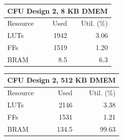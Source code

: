 \begin{table}[H]
\begin{minipage}{0.48\textwidth}
\begin{tabular}{|l|r|r|}
\end{tabular}
\end{minipage}

\vspace{15pt}

\begin{minipage}{0.48\textwidth}\centering
\begin{tabular}{|l|r|r|}
\hline
\multicolumn{3}{|c|}{\textbf{CFU Design 2, 8 KB DMEM}} \\ \hline
Resource & Used & Util. (\%) \\ \hline
LUTs & 1942 & 3.06 \\ \hline
FFs  & 1519 & 1.20 \\ \hline
BRAM & 8.5  & 6.3 \\ \hline

\end{tabular}
\end{minipage}\hfill
\begin{minipage}{0.48\textwidth}\centering
\begin{tabular}{|l|r|r|}
\hline
\multicolumn{3}{|c|}{\textbf{CFU Design 2, 512 KB DMEM}} \\ \hline
Resource & Used & Util. (\%) \\ \hline
LUTs & 2146  & 3.38 \\ \hline
FFs  & 1531  & 1.21 \\ \hline
BRAM & 134.5 & 99.63 \\ \hline

\end{tabular}
\end{minipage}

\end{table}